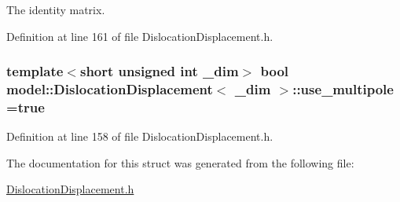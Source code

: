 The identity matrix. 



Definition at line 161 of file Dislocation\+Displacement.\+h.

\hypertarget{structmodel_1_1_dislocation_displacement_ae6c30ea7e7b36e1daa8579202b1a5060}{}
\subsubsection[{use\+\_\+multipole}]{\setlength{\rightskip}{0pt plus 5cm}template$<$short unsigned int \+\_\+dim$>$ bool {\bf model\+::\+Dislocation\+Displacement}$<$ \+\_\+dim $>$\+::use\+\_\+multipole =true\hspace{0.3cm}{\ttfamily [static]}}\label{structmodel_1_1_dislocation_displacement_ae6c30ea7e7b36e1daa8579202b1a5060}


Definition at line 158 of file Dislocation\+Displacement.\+h.



The documentation for this struct was generated from the following file\+:\begin{DoxyCompactItemize}
\item 
\hyperlink{_dislocation_displacement_8h}{Dislocation\+Displacement.\+h}\end{DoxyCompactItemize}

